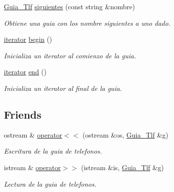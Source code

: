 \begin{DoxyCompactItemize}
\mbox{\hyperlink{classGuia__Tlf}{Guia\+\_\+\+Tlf}} \mbox{\hyperlink{classGuia__Tlf_a20ab0ba1722b23d3b13746e75ee23b53}{siguientes}} (const string \&nombre)
\begin{DoxyCompactList}\small\item\em Obtiene una guia con los nombre siguientes a uno dado. \end{DoxyCompactList}\item 
\mbox{\label{classGuia__Tlf_a0a0f50f45b96349e005d7457a0c05574}} 
\mbox{\hyperlink{classGuia__Tlf_1_1iterator}{iterator}} \mbox{\hyperlink{classGuia__Tlf_a0a0f50f45b96349e005d7457a0c05574}{begin}} ()
\begin{DoxyCompactList}\small\item\em Inicializa un iterator al comienzo de la guia. \end{DoxyCompactList}\item 
\mbox{\label{classGuia__Tlf_a91777ba1c5e206259943af1eae5aa305}} 
\mbox{\hyperlink{classGuia__Tlf_1_1iterator}{iterator}} \mbox{\hyperlink{classGuia__Tlf_a91777ba1c5e206259943af1eae5aa305}{end}} ()
\begin{DoxyCompactList}\small\item\em Inicializa un iterator al final de la guia. \end{DoxyCompactList}\end{DoxyCompactItemize}
\subsection*{Friends}
\begin{DoxyCompactItemize}
\item 
ostream \& \mbox{\hyperlink{classGuia__Tlf_a73eb02557f3118999710c66aa9ecf309}{operator$<$$<$}} (ostream \&os, \mbox{\hyperlink{classGuia__Tlf}{Guia\+\_\+\+Tlf}} \&g)
\begin{DoxyCompactList}\small\item\em Escritura de la guia de telefonos. \end{DoxyCompactList}\item 
istream \& \mbox{\hyperlink{classGuia__Tlf_ac15a5b0c2eb7d5b1843f11beb492495e}{operator$>$$>$}} (istream \&is, \mbox{\hyperlink{classGuia__Tlf}{Guia\+\_\+\+Tlf}} \&g)
\begin{DoxyCompactList}\small\item\em Lectura de la guia de telefonos. \end{DoxyCompactList}\end{DoxyCompactItemize}


